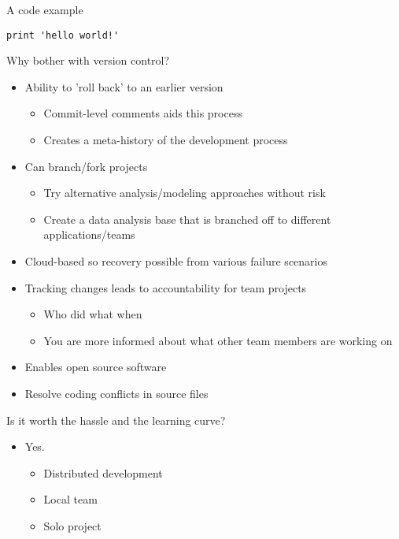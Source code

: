 
\begin{frame}[t,plain]
	\titlepage
\end{frame}

\begin{frame}[fragile]{A code example}
\begin{verbatim}
print 'hello world!'
\end{verbatim}
\end{frame}

\begin{frame}[t]{Why bother with version control?}
 \begin{itemize}
 \item Ability to 'roll back' to an earlier version
   \begin{itemize}
   \item{Commit-level comments aids this process}
   \item{Creates a meta-history of the development process}
   \end{itemize}
 \item Can branch/fork projects
 	\begin{itemize}
 	\item{Try alternative analysis/modeling approaches without risk}
 	\item{Create a data analysis base that is branched off to different 	applications/teams}
 	\end{itemize}
 \item{Cloud-based so recovery possible from various failure scenarios}
 \item Tracking changes leads to accountability for team projects
   \begin{itemize}
   \item Who did what when
   \item You are more informed about what other team members are working on
   \end{itemize}
  \item{Enables open source software}
  \item{Resolve coding conflicts in source files}
 \end{itemize}
\end{frame}

\begin{frame}[t,fragile]{Is it worth the hassle and the learning curve?}
\begin{itemize}
\item Yes.
	\begin{itemize}
	\item Distributed development
	\item Local team
	\item Solo project
	\end{itemize}

\end{itemize}
\end{frame}

